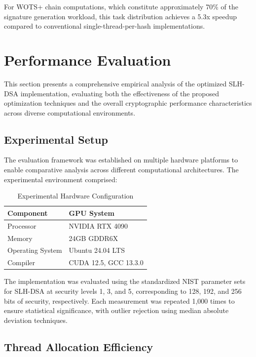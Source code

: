 \documentclass[journal]{IEEEtran}
\begin{document}
For WOTS+ chain computations, which constitute approximately 70\% of the signature generation workload, this task distribution achieves a 5.3x speedup compared to conventional single-thread-per-hash implementations.

\color{blue}

\section{Performance Evaluation}\label{sec:evaluation}

This section presents a comprehensive empirical analysis of the optimized SLH-DSA implementation, evaluating both the effectiveness of the proposed optimization techniques and the overall cryptographic performance characteristics across diverse computational environments.

\subsection{Experimental Setup}

The evaluation framework was established on multiple hardware platforms to enable comparative analysis across different computational architectures. The experimental environment comprised:

\begin{table}[h]
\centering
\caption{Experimental Hardware Configuration}
\label{tab:hardware_config}
\begin{tabular}{@{}ll@{}}
\toprule
\textbf{Component} & \textbf{GPU System} \\
\midrule
Processor & NVIDIA RTX 4090 \\
Memory & 24GB GDDR6X \\
Operating System & Ubuntu 24.04 LTS \\
Compiler & CUDA 12.5, GCC 13.3.0 \\
\bottomrule
\end{tabular}
\end{table}

The implementation was evaluated using the standardized NIST parameter sets for SLH-DSA at security levels 1, 3, and 5, corresponding to 128, 192, and 256 bits of security, respectively. Each measurement was repeated 1,000 times to ensure statistical significance, with outlier rejection using median absolute deviation techniques.

\subsection{Thread Allocation Efficiency}
\end{document}
